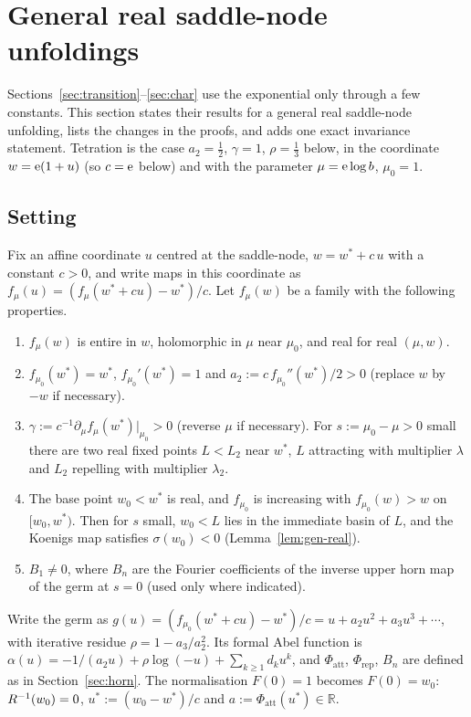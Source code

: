 \section{General real saddle-node unfoldings}\label{sec:general}

Sections~\ref{sec:transition}--\ref{sec:char} use the exponential only through a
few constants.  This section states their results for a general real
saddle-node unfolding, lists the changes in the proofs, and adds one exact
invariance statement.  Tetration is the case $a_2=\tfrac12$, $\gamma=1$,
$\rho=\tfrac13$ below, in the coordinate $w=\mathrm{e}(1+u)$ (so $c=\mathrm{e}$ below) and
with the parameter $\mu=\mathrm{e}\log b$, $\mu_0=1$.

\subsection{Setting}
Fix an affine coordinate $u$ centred at the saddle-node, $w=w^*+c\,u$ with a
constant $c>0$, and write maps in this coordinate as
$f_\mu(u)=(f_\mu(w^*+cu)-w^*)/c$.
Let $f_\mu(w)$ be a family with the following properties.
\begin{enumerate}
\item[(H1)] $f_\mu(w)$ is entire in $w$, holomorphic in $\mu$ near $\mu_0$, and
  real for real $(\mu,w)$.
\item[(H2)] $f_{\mu_0}(w^*)=w^*$, $f_{\mu_0}'(w^*)=1$ and
  $a_2:=c\,f_{\mu_0}''(w^*)/2>0$ (replace $w$ by $-w$ if necessary).
\item[(H3)] $\gamma:=c^{-1}\partial_\mu f_\mu(w^*)|_{\mu_0}>0$ (reverse $\mu$ if
  necessary).  For $s:=\mu_0-\mu>0$ small there are two real fixed points
  $L<L_2$ near $w^*$, $L$ attracting with multiplier $\lambda$ and $L_2$ repelling
  with multiplier $\lambda_2$.
\item[(H4)] The base point $w_0<w^*$ is real, and $f_{\mu_0}$ is increasing with
  $f_{\mu_0}(w)>w$ on $[w_0,w^*)$.  Then for $s$ small, $w_0<L$ lies in the
  immediate basin of $L$, and the Koenigs map satisfies $\sigma(w_0)<0$
  (Lemma~\ref{lem:gen-real}).
\item[(H5)] $B_1\ne0$, where $B_n$ are the Fourier coefficients of the inverse upper
  horn map of the germ at $s=0$ (used only where indicated).
\end{enumerate}
Write the germ as $g(u)=(f_{\mu_0}(w^*+cu)-w^*)/c=u+a_2u^2+a_3u^3+\cdots$, with
iterative residue $\rho=1-a_3/a_2^2$.  Its formal Abel function is
$\alpha(u)=-1/(a_2u)+\rho\log(-u)+\sum_{k\ge1}d_ku^k$, and $\Phi_{\mathrm{att}}$,
$\Phi_{\mathrm{rep}}$, $B_n$ are defined as in Section~\ref{sec:horn}.  The
normalisation $F(0)=1$ becomes $F(0)=w_0$: $R^{-1}(w_0)=0$,
$u^*:=(w_0-w^*)/c$ and $a:=\Phi_{\mathrm{att}}(u^*)\in\mathbb R$.

